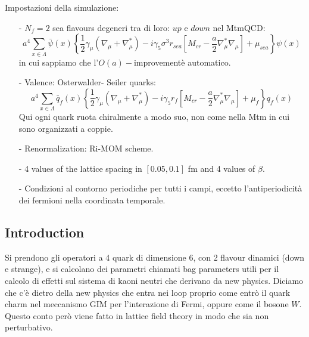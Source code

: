 \documentclass[12pt,a4paper,openright]{article}
\newcommand{\oait}{$O(a)-$improvement}
\begin{document}
Impostazioni della simulazione:
\begin{itemize}
  \item [-] $N_f = 2$ sea flavours degeneri tra di loro: $up$ e $down$ nel MtmQCD:
    \begin{equation*}
      a^4 \sum_{x\in \Lambda} \bar \psi (x) \left\{ \frac{1}{2} \gamma_\mu (\nabla_\mu + \nabla_\mu^*) - i \gamma_5 \sigma^3 r_{sea} \left[ M_{cr}-\frac{a}{2}\nabla_\mu^* \nabla_\mu \right] +\mu_{sea} \right\} \psi (x)
    \end{equation*}
    in cui sappiamo che l'\oait\space è automatico.
  \item [-] Valence: Osterwalder- Seiler quarks:
    \begin{equation*}
      a^4 \sum_{x\in \Lambda} \bar q_f (x) \left\{ \frac{1}{2} \gamma_\mu (\nabla_\mu + \nabla_\mu^*) - i \gamma_5 r_f \left[ M_{cr}-\frac{a}{2}\nabla_\mu^* \nabla_\mu \right] +\mu_{f} \right\} q_f (x)
    \end{equation*}
    Qui ogni quark ruota chiralmente a modo suo, non come nella Mtm in cui sono organizzati a coppie.
  \item [-] Renormalization: Ri-MOM scheme.
  \item [-] 4 values of the lattice spacing in $[0.05, 0.1]$ fm and 4 values of $\beta$.
  \item [-] Condizioni al contorno periodiche per tutti i campi, eccetto l'antiperiodicità dei fermioni nella coordinata temporale.
\end{itemize}

\subsection{Introduction}
Si prendono gli operatori a 4 quark di dimensione 6, con 2 flavour dinamici (down e strange), e si calcolano dei parametri chiamati bag parameters utili per il calcolo di effetti sul sistema di kaoni neutri che derivano da new physics.
Diciamo che c'è dietro della new physics che entra nei loop proprio come entrò il quark charm nel meccanismo GIM per l'interazione di Fermi, oppure come il bosone $W$.
Questo conto però viene fatto in lattice field theory in modo che sia non perturbativo.
\end{document}
